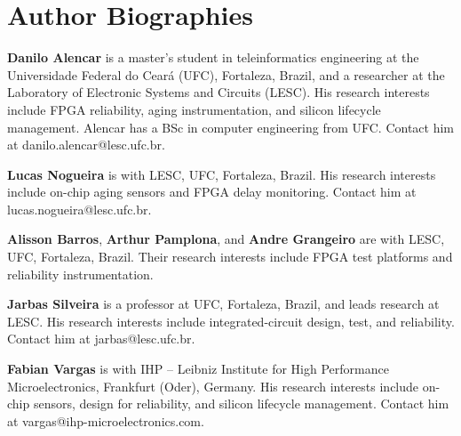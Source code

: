 \documentclass[10pt,twocolumn]{article}
\begin{document}
\section*{Author Biographies}
\footnotesize
\noindent\textbf{Danilo Alencar} is a master's student in teleinformatics engineering at the Universidade Federal do Cear\'a (UFC), Fortaleza, Brazil, and a researcher at the Laboratory of Electronic Systems and Circuits (LESC). His research interests include FPGA reliability, aging instrumentation, and silicon lifecycle management. Alencar has a BSc in computer engineering from UFC. Contact him at danilo.alencar@lesc.ufc.br.

\smallskip\noindent\textbf{Lucas Nogueira} is with LESC, UFC, Fortaleza, Brazil. His research interests include on-chip aging sensors and FPGA delay monitoring. Contact him at lucas.nogueira@lesc.ufc.br.

\smallskip\noindent\textbf{Alisson Barros}, \textbf{Arthur Pamplona}, and \textbf{Andre Grangeiro} are with LESC, UFC, Fortaleza, Brazil. Their research interests include FPGA test platforms and reliability instrumentation.

\smallskip\noindent\textbf{Jarbas Silveira} is a professor at UFC, Fortaleza, Brazil, and leads research at LESC. His research interests include integrated-circuit design, test, and reliability. Contact him at jarbas@lesc.ufc.br.

\smallskip\noindent\textbf{Fabian Vargas} is with IHP -- Leibniz Institute for High Performance Microelectronics, Frankfurt (Oder), Germany. His research interests include on-chip sensors, design for reliability, and silicon lifecycle management. Contact him at vargas@ihp-microelectronics.com.
\end{document}
